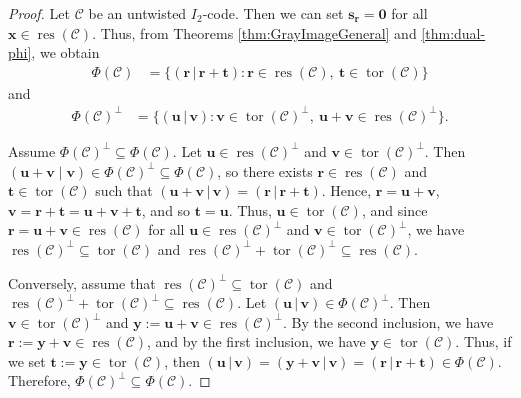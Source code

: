 \documentclass[12pt]{article}
\theoremstyle{definition}
\theoremstyle{plain}
\begin{document}
\begin{proof}
Let $\mathcal{C}$ be an untwisted $I_2$-code. Then we can set $\mathbf{s}_{\mathbf{r}} = \mathbf{0}$ for all $\mathbf{x} \in \operatorname{res} ( \mathcal{C} )$. Thus, from Theorems \ref{thm:GrayImageGeneral} and \ref{thm:dual-phi}, we obtain
\begin{align*}
\Phi(\mathcal{C})
&=
\{ (\mathbf{r} \, | \, \mathbf{r} + \mathbf{t}) \mathrel{:}  \mathbf{r} \in \operatorname{res}(\mathcal{C}),\ \mathbf{t} \in \operatorname{tor}(\mathcal{C}) \}
\end{align*}
and
\begin{align*}
\Phi(\mathcal{C})^\perp
&=
\{ (\mathbf{u} \, | \, \mathbf{v}) \mathrel{:}  \mathbf{v} \in \operatorname{tor}(\mathcal{C})^\perp,\ \mathbf{u} + \mathbf{v} \in \operatorname{res}(\mathcal{C})^\perp \}.
\end{align*}


Assume $\Phi(\mathcal{C})^\perp \subseteq \Phi(\mathcal{C})$.
Let $\mathbf{u} \in \operatorname{res}(\mathcal{C})^\perp$ and $\mathbf{v} \in \operatorname{tor}(\mathcal{C})^\perp$. Then
$
(\mathbf{u} + \mathbf{v} \mid \mathbf{v}) \in \Phi(\mathcal{C})^\perp
\subseteq \Phi(\mathcal{C})
$,
so there exists $\mathbf{r} \in \operatorname{res}(\mathcal{C})$ and $\mathbf{t} \in \operatorname{tor}(\mathcal{C})$ such that
$
(\mathbf{u} + \mathbf{v} \, | \, \mathbf{v})
= (\mathbf{r} \, | \, \mathbf{r} + \mathbf{t})
$.
Hence,
$
\mathbf{r} = \mathbf{u} + \mathbf{v}
$,
$\mathbf{v} = \mathbf{r} + \mathbf{t} = \mathbf{u} + \mathbf{v} + \mathbf{t}
$,
and so
$
\mathbf{t} = \mathbf{u}
$.
Thus, $\mathbf{u} \in \operatorname{tor}(\mathcal{C})$, and since $\mathbf{r} = \mathbf{u} + \mathbf{v} \in \operatorname{res}(\mathcal{C})$ for all $\mathbf{u} \in \operatorname{res}(\mathcal{C})^\perp$ and $\mathbf{v} \in \operatorname{tor}(\mathcal{C})^\perp$, we have
$
\operatorname{res}(\mathcal{C})^\perp  \subseteq \operatorname{tor}(\mathcal{C})$
and
$
\operatorname{res}(\mathcal{C})^\perp + \operatorname{tor}(\mathcal{C})^\perp \subseteq \operatorname{res}(\mathcal{C})
$.


Conversely, assume that
$
\operatorname{res}(\mathcal{C})^\perp \subseteq \operatorname{tor}(\mathcal{C})
$
and
$
\operatorname{res}(\mathcal{C})^\perp + \operatorname{tor}(\mathcal{C})^\perp \subseteq \operatorname{res}(\mathcal{C})
$.
Let $(\mathbf{u} \, | \, \mathbf{v}) \in \Phi(\mathcal{C})^\perp$. Then $\mathbf{v} \in \operatorname{tor}(\mathcal{C})^\perp$ and
$
\mathbf{y} := \mathbf{u} + \mathbf{v} \in \operatorname{res}(\mathcal{C})^\perp
$.
By the second inclusion, we have
$
\mathbf{r} := \mathbf{y} + \mathbf{v} \in \operatorname{res}(\mathcal{C})
$,
and by the first inclusion, we have $\mathbf{y} \in \operatorname{tor}(\mathcal{C})$. Thus, if we set $\mathbf{t} := \mathbf{y} \in \operatorname{tor}(\mathcal{C})$, then
$
(\mathbf{u} \, | \,  \mathbf{v})
= (\mathbf{y} + \mathbf{v} \, | \,  \mathbf{v})
= (\mathbf{r} \, | \,  \mathbf{r} + \mathbf{t}) \in \Phi(\mathcal{C})
$.
Therefore, $\Phi(\mathcal{C})^\perp \subseteq \Phi(\mathcal{C})$.
\end{proof}
\end{document}
